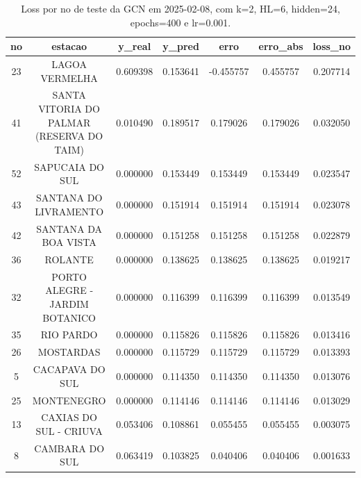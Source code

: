 \begin{table}[h]
\centering
\caption{Loss por no de teste da GCN em 2025-02-08, com k=2, HL=6, hidden=24, epochs=400 e lr=0.001.}
\label{tab:gcn_loss_k2_hl6_h24_e400_d20250208}
\begin{tabular}{ccccccc}
\toprule
no & estacao & y\_real & y\_pred & erro & erro\_abs & loss\_no \\
\midrule
23 & LAGOA VERMELHA & 0.609398 & 0.153641 & -0.455757 & 0.455757 & 0.207714 \\
41 & SANTA VITORIA DO PALMAR (RESERVA DO TAIM) & 0.010490 & 0.189517 & 0.179026 & 0.179026 & 0.032050 \\
52 & SAPUCAIA DO SUL & 0.000000 & 0.153449 & 0.153449 & 0.153449 & 0.023547 \\
43 & SANTANA DO LIVRAMENTO & 0.000000 & 0.151914 & 0.151914 & 0.151914 & 0.023078 \\
42 & SANTANA DA BOA VISTA & 0.000000 & 0.151258 & 0.151258 & 0.151258 & 0.022879 \\
36 & ROLANTE & 0.000000 & 0.138625 & 0.138625 & 0.138625 & 0.019217 \\
32 & PORTO ALEGRE - JARDIM BOTANICO & 0.000000 & 0.116399 & 0.116399 & 0.116399 & 0.013549 \\
35 & RIO PARDO & 0.000000 & 0.115826 & 0.115826 & 0.115826 & 0.013416 \\
26 & MOSTARDAS & 0.000000 & 0.115729 & 0.115729 & 0.115729 & 0.013393 \\
5 & CACAPAVA DO SUL & 0.000000 & 0.114350 & 0.114350 & 0.114350 & 0.013076 \\
25 & MONTENEGRO & 0.000000 & 0.114146 & 0.114146 & 0.114146 & 0.013029 \\
13 & CAXIAS DO SUL - CRIUVA & 0.053406 & 0.108861 & 0.055455 & 0.055455 & 0.003075 \\
8 & CAMBARA DO SUL & 0.063419 & 0.103825 & 0.040406 & 0.040406 & 0.001633 \\
\bottomrule
\end{tabular}
\end{table}
